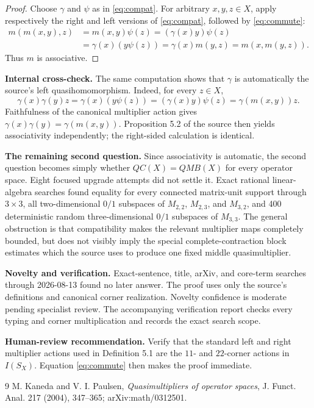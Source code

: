 \documentclass[11pt]{article}
\begin{document}
\begin{proof}
Choose $\gamma$ and $\psi$ as in \eqref{eq:compat}. For arbitrary
$x,y,z\in X$, apply respectively the right and left versions of
\eqref{eq:compat}, followed by \eqref{eq:commute}:
\begin{align*}
 m(m(x,y),z)
 &=m(x,y)\psi(z)
   =(\gamma(x)y)\psi(z)\\
 &=\gamma(x)(y\psi(z))
   =\gamma(x)m(y,z)
   =m(x,m(y,z)).
\end{align*}
Thus $m$ is associative.
\end{proof}

\textbf{Internal cross-check.} The same computation shows that $\gamma$ is
automatically the source's left quasihomomorphism. Indeed, for every $z\in X$,
\[
 \gamma(x)\gamma(y)z
 =\gamma(x)(y\psi(z))
 =(\gamma(x)y)\psi(z)
 =\gamma(m(x,y))z.
\]
Faithfulness of the canonical multiplier action gives
$\gamma(x)\gamma(y)=\gamma(m(x,y))$. Proposition 5.2 of the source then yields
associativity independently; the right-sided calculation is identical.

\textbf{The remaining second question.} Since associativity is automatic,
the second question becomes simply whether $QC(X)=QMB(X)$ for every operator
space. Eight focused upgrade attempts did not settle it. Exact rational
linear-algebra searches found equality for every connected matrix-unit
support through $3\times3$, all two-dimensional $0/1$ subspaces of
$M_{2,2}$, $M_{2,3}$, and $M_{3,2}$, and 400 deterministic random
three-dimensional $0/1$ subspaces of $M_{3,3}$. The general obstruction is
that compatibility makes the relevant multiplier maps completely bounded,
but does not visibly imply the special complete-contraction block estimates
which the source uses to produce one fixed middle quasimultiplier.

\textbf{Novelty and verification.} Exact-sentence, title, arXiv, and core-term
searches through 2026-08-13 found no later answer. The proof uses only the
source's definitions and canonical corner realization. Novelty confidence is
moderate pending specialist review. The accompanying verification report
checks every typing and corner multiplication and records the exact search
scope.

\textbf{Human-review recommendation.} Verify that the standard left and right
multiplier actions used in Definition 5.1 are the $11$- and $22$-corner
actions in $I(S_X)$. Equation \eqref{eq:commute} then makes the proof
immediate.

\begin{thebibliography}{9}
M. Kaneda and V. I. Paulsen,
\emph{Quasimultipliers of operator spaces},
J. Funct. Anal. 217 (2004), 347--365; arXiv:math/0312501.
\end{thebibliography}
\end{document}
